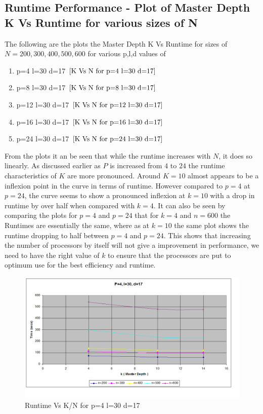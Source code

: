 \documentclass[twoside,11pt]{article}\usepackage{amsmath,amsfonts,amsthm,fullpage}
\begin{document}
\pagebreak
\subsection{Runtime Performance - Plot of Master Depth K Vs Runtime for various sizes of N}

The following are the plots the Master Depth K Vs Runtime for sizes of $N={200,300,400,500,600}$ for various p,l,d values of 
\begin{enumerate}
\item
p=4 l=30 d=17 $\eqref{K Vs N for p=4 l=30 d=17}$
\item
p=8 l=30 d=17 $\eqref{K Vs N for p=8 l=30 d=17}$
\item
p=12 l=30 d=17 $\eqref{K Vs N for p=12 l=30 d=17}$
\item
p=16 l=30 d=17 $\eqref{K Vs N for p=16 l=30 d=17}$
\item
p=24 l=30 d=17 $\eqref{K Vs N for p=24 l=30 d=17}$
\end{enumerate}
From the plots it an be seen that while the runtime increases with $N$, it does so linearly. As discussed earlier as $P$ is increased from $4$ to $24$ the runtime characteristics of $K$ are more pronounced. Around $K=10$ almost appears to be a inflexion point in the curve in terms of runtime. However compared to $p=4$ at $p=24$, the curve seems to show a pronounced inflexion at $k=10$ with a drop in runtime by over half when compared with $k=4$. It can also be seen by comparing the plots for $p=4$ and $p=24$ that for $k=4$ and $n=600$ the Runtimes are essentially the same, where as at $k=10$ the same plot shows the runtime dropping to half between $p=4$ and $p=24$. This shows that increasing the number of processors by itself will not give a improvement in performance, we need to have the right value of $k$ to ensure that the processors are put to optimum use for the best efficiency and runtime.

\begin{figure}[!htbp]
\centering
\includegraphics[scale=.46]{images/pld_p=4-l=30-d=17} 
\caption{Runtime Vs K/N for p=4 l=30 d=17}
\label{K Vs N for p=4 l=30 d=17}
\end{figure}
\end{document}
